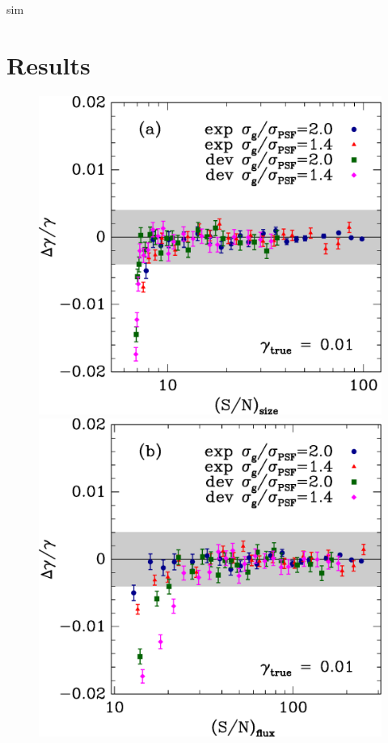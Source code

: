 \documentclass[12pt,preprint]{aastex}
\begin{document}
sim

\section{Results} \label{sec:results}

\begin{figure}[p] \centering
 \centering 
 \includegraphics[scale=0.45]{figures/cbafit-geg-T-s2n.eps}
 \includegraphics[scale=0.45]{figures/cbafit-geg-flux-s2n.eps}


\end{figure}
\end{document}
